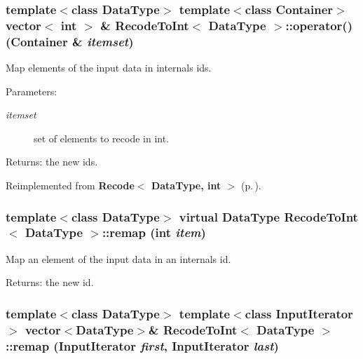 \subsubsection{\setlength{\rightskip}{0pt plus 5cm}template$<$class Data\-Type$>$ template$<$class Container$>$ vector$<$ int $>$ \& {\bf Recode\-To\-Int}$<$ Data\-Type $>$::operator() (Container \& {\em itemset})}\label{class_recode_to_int_7d3d3ea423abd8e055ba4483744fba04}


Map elements of the input data in internals ids. 

\begin{Desc}
\item[Parameters:]
\begin{description}
\item[{\em itemset}]set of elements to recode in int. \end{description}
\end{Desc}
\begin{Desc}
\item[Returns:]the new ids. \end{Desc}


Reimplemented from {\bf Recode$<$ Data\-Type, int $>$} {\rm (p.\,\pageref{class_recode_d4fc62868c9f2097c762a6e0c66ae685})}.
\subsubsection{\setlength{\rightskip}{0pt plus 5cm}template$<$class Data\-Type$>$ virtual Data\-Type {\bf Recode\-To\-Int}$<$ Data\-Type $>$::remap (int {\em item})\hspace{0.3cm}{\tt  [inline, virtual]}}\label{class_recode_to_int_338aeadf35cd3aad00d61d313bdf59d2}


Map an element of the input data in an internals id. 

\begin{Desc}
\item[Returns:]the new id. \end{Desc}
\subsubsection{\setlength{\rightskip}{0pt plus 5cm}template$<$class Data\-Type$>$ template$<$class Input\-Iterator$>$ vector$<$Data\-Type$>$\& {\bf Recode\-To\-Int}$<$ Data\-Type $>$::remap (Input\-Iterator {\em first}, Input\-Iterator {\em last})\hspace{0.3cm}{\tt  [inline]}}\label{class_recode_to_int_a138eafdc7693c0cf5057c6fc786d80b}



